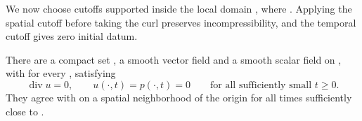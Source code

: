 We now choose cutoffs supported inside the local domain
, where
. Applying the spatial cutoff before taking the curl preserves
incompressibility, and the temporal cutoff gives zero initial datum.

\begin{proposition}\label{prop:10.1}
There are a compact set , a smooth vector field
 and a smooth scalar field  on
\NSi{NS-F-P117-033}{\mathbb R^3\times[0,1)}, with
 for every
, satisfying
\begin{equation}
\operatorname{div}u=0,
\qquad u(\mathord\cdot,t)=p(\mathord\cdot,t)=0
\qquad\text{for all sufficiently small }t\geq0.
\tag{10.2}\label{eq:10.2}
\end{equation}
They agree with  on a spatial neighborhood
of the origin for all times sufficiently close to .
\end{proposition}
%
